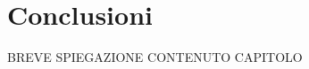\chapter{Conclusioni} %
%


\begin{citazione}
	BREVE SPIEGAZIONE CONTENUTO CAPITOLO
\end{citazione}

\newpage
